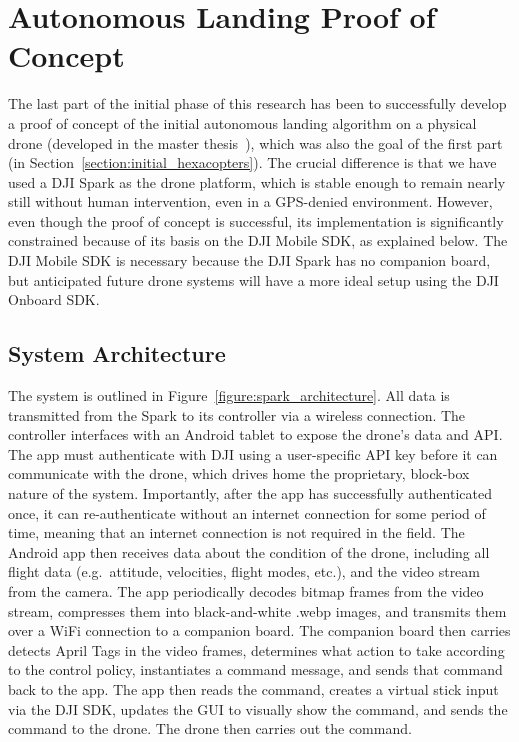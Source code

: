 \section{Autonomous Landing Proof of Concept}
\label{section:proof_of_concept}

The last part of the initial phase of this research has been to successfully develop a proof of concept
of the initial autonomous landing algorithm on a physical drone (developed in the master thesis~\cite{joshua_master_thesis}), which was also the goal of the first part (in Section~\ref{section:initial_hexacopters}).
The crucial difference is that we have used a DJI Spark as the drone platform,
which is stable enough to remain nearly still without human intervention,
even in a GPS-denied environment.
However, even though the proof of concept is successful,
its implementation is significantly constrained because of its basis on the DJI Mobile SDK,
as explained below.
The DJI Mobile SDK is necessary because the DJI Spark has no companion board,
but anticipated future drone systems will have a more ideal setup using the DJI Onboard SDK.

\subsection{System Architecture}

The system is outlined in Figure~\ref{figure:spark_architecture}.
All data is transmitted from the Spark to its controller via a wireless connection.
The controller interfaces with an Android tablet to expose the drone's data and API.
The app must authenticate with DJI using a user-specific API key
before it can communicate with the drone,
which drives home the proprietary, block-box nature of the system.
Importantly, after the app has successfully authenticated once, it can re-authenticate without
an internet connection for some period of time,
meaning that an internet connection is not required in the field.
The Android app then receives data about the condition of the drone,
including all flight data (e.g.~attitude, velocities, flight modes, etc.),
and the video stream from the camera.
The app periodically decodes bitmap frames from the video stream,
compresses them into black-and-white .webp images,
and transmits them over a WiFi connection to a companion board.
The companion board then carries detects April Tags in the video frames,
determines what action to take according to the control policy,
instantiates a command message,
and sends that command back to the app.
The app then reads the command,
creates a virtual stick input via the DJI SDK,
updates the GUI to visually show the command,
and sends the command to the drone.
The drone then carries out the command.

